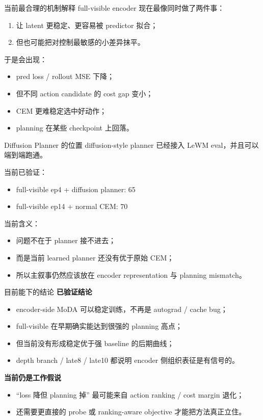 \documentclass[aspectratio=169,11pt]{beamer}
\begin{document}
\begin{frame}{当前最合理的机制解释}
  full-visible encoder 现在最像同时做了两件事：
  \begin{enumerate}
    \item 让 latent 更稳定、更容易被 predictor 拟合；
    \item 但也可能把对控制最敏感的小差异抹平。
  \end{enumerate}

  于是会出现：
  \begin{itemize}
    \item pred loss / rollout MSE 下降；
    \item 但不同 action candidate 的 cost gap 变小；
    \item CEM 更难稳定选中好动作；
    \item planning 在某些 checkpoint 上回落。
  \end{itemize}
\end{frame}

\begin{frame}{Diffusion Planner 的位置}
  diffusion-style planner 已经接入 LeWM eval，并且可以端到端跑通。

  当前已验证：
  \begin{itemize}
    \item full-visible ep4 + diffusion planner: 65
    \item full-visible ep14 + normal CEM: 70
  \end{itemize}

  当前含义：
  \begin{itemize}
    \item 问题不在于 planner 接不进去；
    \item 而是当前 learned planner 还没有优于原始 CEM；
    \item 所以主叙事仍然应该放在 encoder representation 与 planning mismatch。
  \end{itemize}
\end{frame}

\begin{frame}{目前能下的结论}
  \textbf{已验证结论}
  \begin{itemize}
    \item encoder-side MoDA 可以稳定训练，不再是 autograd / cache bug；
    \item full-visible 在早期确实能达到很强的 planning 高点；
    \item 但当前没有形成稳定优于强 baseline 的后期曲线；
    \item depth branch / late8 / late10 都说明 encoder 侧组织表征是有信号的。
  \end{itemize}

  \textbf{当前仍是工作假说}
  \begin{itemize}
    \item ``loss 降但 planning 掉'' 最可能来自 action ranking / cost margin 退化；
    \item 还需要更直接的 probe 或 ranking-aware objective 才能把方法真正立住。
  \end{itemize}
\end{frame}
\end{document}

